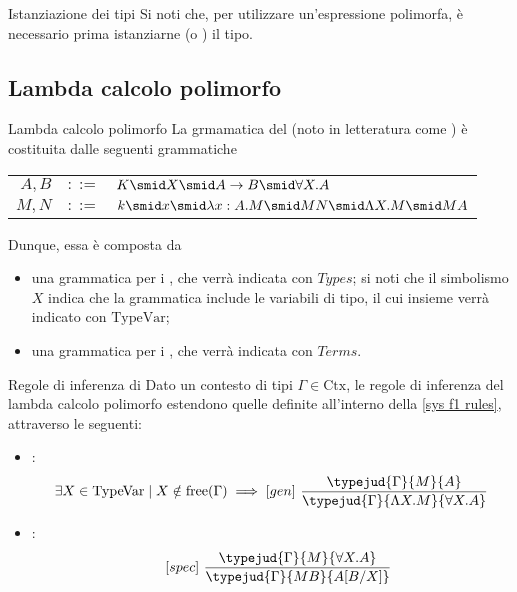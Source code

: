 \documentclass[a4paper, 12pt]{report}
\begin{document}
    \begin{framedobs}{Istanziazione dei tipi}
        Si noti che, per utilizzare un'espressione polimorfa, è necessario prima istanziarne (o ) il tipo.
    \end{framedobs}

    \subsection{Lambda calcolo polimorfo}

    \begin{frameddefn}{Lambda calcolo polimorfo}
        La grmamatica del  (noto in letteratura come ) è costituita dalle seguenti grammatiche

        \begin{center}
            \begin{tabular}{rcl}
                $A, B$ & $::=$ & $K \smid X \smid A \to B \smid \forall X.A$ \\
                $M, N$ & $::=$ & $k \smid x \smid \lambda x:A.M \smid MN \smid \Lambda X.M \smid M A$ \\
            \end{tabular}
        \end{center}

        Dunque, essa è composta da
        \begin{itemize}
            \item una grammatica per i , che verrà indicata con $Types$; si noti che il simbolismo $X$ indica che la grammatica include le variabili di tipo, il cui insieme verrà indicato con $\mathrm{TypeVar}$;
            \item una grammatica per i , che verrà indicata con $Terms$.
        \end{itemize}
    \end{frameddefn}

    \begin{framedprop}[label={regole system F}]{Regole di inferenza di }
        Dato un contesto di tipi $\Gamma \in \mathrm{Ctx}$, le regole di inferenza del lambda calcolo polimorfo estendono quelle definite all'interno della \cref{sys f1 rules}, attraverso le seguenti:

        \begin{itemize}
            \item {}: $$\exists X \in \mathrm{TypeVar} \mid X \notin \mathrm{free}(\Gamma) \implies [gen] \ \dfrac{\typejud{\Gamma}{M}{A}}{\typejud{\Gamma}{\Lambda X.M}{\forall X.A}}$$
            \item {}: $$\quad [spec] \ \dfrac{\typejud{\Gamma}{M}{\forall X.A}}{\typejud{\Gamma}{MB}{A[B/X]}}$$
        \end{itemize}
    \end{framedprop}
\end{document}
